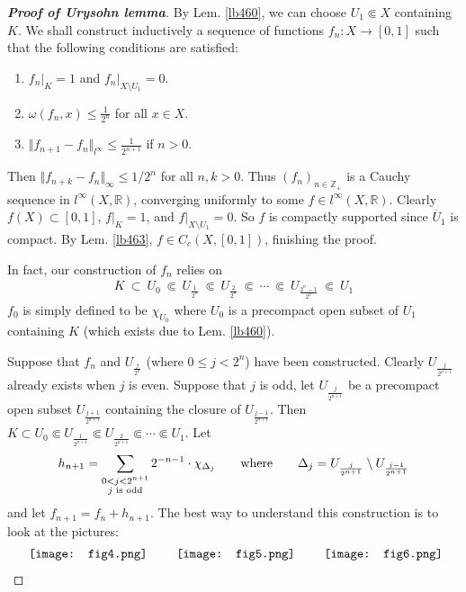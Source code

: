 \documentclass[12pt,b5paper,notitlepage]{article}
\theoremstyle{definition}
\theoremstyle{plain}
\newcommand{\ovl}{\overline}
\newcommand{\Zbb}{\mathbb Z}
\newcommand{\Rbb}{\mathbb R}
\numberwithin{equation}{section}
\begin{document}
\begin{proof}[\textbf{Proof of Urysohn lemma}]
By Lem. \ref{lb460}, we can choose $U_1\Subset X$ containing $K$. We shall construct inductively a sequence of functions $f_n:X\rightarrow[0,1]$ such that the following conditions are satisfied:
\begin{enumerate}[label=(\alph*)]
\item $f_n|_K=1$ and $f_n|_{X\setminus U_1}=0$.
\item $\omega(f_n,x)\leq \frac 1{2^n}$ for all $x\in X$.
\item $\Vert f_{n+1}-f_n\Vert_{l^\infty}\leq \frac 1{2^{n+1}}$ if $n>0$.
\end{enumerate}
Then $\Vert f_{n+k}-f_n\Vert_\infty\leq 1/2^n$ for all $n,k>0$. Thus $(f_n)_{n\in\Zbb_+}$ is a Cauchy sequence in $l^\infty(X,\Rbb)$, converging uniformly to some $f\in l^\infty(X,\Rbb)$. Clearly $f(X)\subset[0,1]$, $f|_K=1$, and $f|_{X\setminus U_1}=0$. So $f$ is compactly supported since $\ovl U_1$ is compact. By Lem. \ref{lb463}, $f\in C_c(X,[0,1])$, finishing the proof.

In fact, our construction of $f_n$ relies on
\begin{align*}
K~\subset~ U_0~\Subset~ U_{\frac 1{2^n}}~\Subset~ U_{\frac 2{2^n}}~\Subset~\cdots~\Subset ~U_{\frac{2^{n}-1}{2^n}}~\Subset ~U_1
\end{align*}
$f_0$ is simply defined to be $\chi_{U_0}$ where $U_0$ is a precompact open subset of $U_1$ containing $K$ (which exists due to Lem. \ref{lb460}). 

Suppose that $f_n$ and $U_{\frac j{2^n}}$ (where $0\leq j<2^n$) have been constructed. Clearly $U_{\frac j{2^{n+1}}}$ already exists when $j$ is even. Suppose that $j$ is odd, let $U_{\frac j{2^{n+1}}}$ be a precompact open subset $U_{\frac {j+1}{2^{n+1}}}$ containing the closure of  $U_{\frac {j-1}{2^{n+1}}}$. Then $K\subset U_0\Subset U_{\frac 1{2^{n+1}}}\Subset U_{\frac 2{2^{n+1}}}\Subset\cdots\Subset U_1$. Let
\begin{align*}
h_{n+1}=\sum_{
\begin{subarray}{c}
0<j<2^{n+1}\\
j\text{ is odd}
\end{subarray}
}2^{-n-1}\cdot\chi_{\Delta_j}\qquad\text{where}\qquad \Delta_j=U_{\frac j{2^{n+1}}}\setminus U_{\frac{j-1}{2^{n+1}}}
\end{align*}
and let $f_{n+1}=f_n+h_{n+1}$. The best way to understand this construction is to look at the pictures:
\begin{gather*}
\vcenter{\hbox{{
			\texttt{[image: fig4.png]}}}}
\qquad
\vcenter{\hbox{{
			\texttt{[image: fig5.png]}}}}
\qquad
\vcenter{\hbox{{
			\texttt{[image: fig6.png]}}}}
\end{gather*}



\end{proof}
\end{document}
